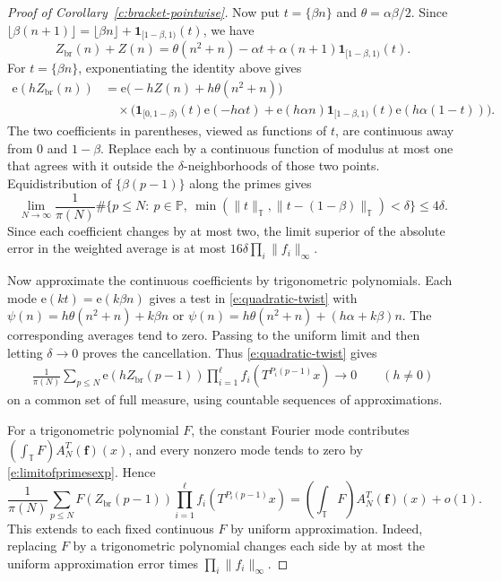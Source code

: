 \documentclass[12pt]{amsart}
\newcommand{\1}{\mathbf 1}
\newcommand{\e}{\mathrm e}
\theoremstyle{definition}
\begin{document}
\begin{proof}[Proof of Corollary~\ref{c:bracket-pointwise}]
Now put $t=\{\beta n\}$ and $\theta=\alpha\beta/2$. Since
$\lfloor\beta(n+1)\rfloor=\lfloor\beta n\rfloor+
\mathbf1_{[1-\beta,1)}(t)$, we have
\[
 Z_{\mathrm{br}}(n)+Z(n)
 =\theta(n^2+n)-\alpha t
  +\alpha(n+1)\mathbf1_{[1-\beta,1)}(t).
\]
For $t=\{\beta n\}$, exponentiating the identity above gives
\begin{align*}
 \e(hZ_{\mathrm{br}}(n))
 &=\e\bigl(-hZ(n)+h\theta(n^2+n)\bigr)\\
 &\quad\times\bigl(
 \mathbf1_{[0,1-\beta)}(t)\e(-h\alpha t)
 +\e(h\alpha n)\mathbf1_{[1-\beta,1)}(t)\e(h\alpha(1-t))
 \bigr).
\end{align*}
The two coefficients in parentheses, viewed as functions of $t$,
are continuous away from $0$ and $1-\beta$. Replace each by a
continuous function of modulus at most one that agrees with it
outside the $\delta$-neighborhoods of those two points.
Equidistribution of $\{\beta(p-1)\}$ along the primes gives
\[
 \lim_{N\to\infty}\frac1{\pi(N)}
 \#\{p\leq N:\ p\in\mathbb P,\
       \min(\|t\|_{\mathbb T},\|t-(1-\beta)\|_{\mathbb T})<\delta\}
 \leq 4\delta.
\]
Since each coefficient changes by at most two, the limit superior
of the absolute error in the weighted average is at most
$16\delta\prod_i\|f_i\|_\infty$.

Now approximate the continuous coefficients by trigonometric
polynomials. Each mode $\e(kt)=\e(k\beta n)$ gives a test in
\eqref{e:quadratic-twist} with
$\psi(n)=h\theta(n^2+n)+k\beta n$ or
$\psi(n)=h\theta(n^2+n)+(h\alpha+k\beta)n$.
The corresponding averages tend to zero. Passing to the uniform
limit and then letting $\delta\to0$ proves the cancellation. Thus \eqref{e:quadratic-twist} gives
\begin{align}\label{e:limitofprimesexp}
    \frac1{\pi(N)}\sum_{p\leq N}\e(hZ_{\mathrm{br}}(p-1))
 \prod_{i=1}^{\ell}f_i(T^{P_i(p-1)}x)
 \longrightarrow 0
 \qquad(h\ne0)
\end{align}
on a common set of full measure, using countable sequences of
approximations.

For a trigonometric polynomial $F$, the constant Fourier mode
contributes $(\int_{\mathbb T}F)A_N^T(\mathbf f)(x)$, and every
nonzero mode tends to zero by \eqref{e:limitofprimesexp}. Hence
\[
 \frac1{\pi(N)}\sum_{p\leq N}F(Z_{\mathrm{br}}(p-1))
 \prod_{i=1}^{\ell}f_i(T^{P_i(p-1)}x)
 =\left(\int_{\mathbb T}F\right)A_N^T(\mathbf f)(x)+o(1).
\]
This extends to each fixed continuous $F$ by uniform approximation.
Indeed, replacing $F$ by a trigonometric polynomial changes each
side by at most the uniform approximation error times
$\prod_i\|f_i\|_\infty$.


\end{proof}
\end{document}
